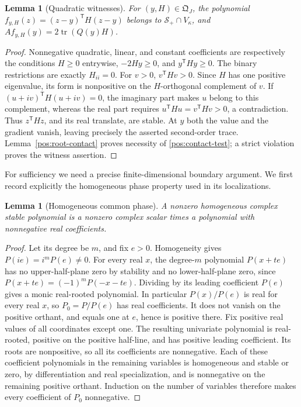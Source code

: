 \documentclass[reqno]{amsart}
\newtheorem{lemma}[theorem]{Lemma}
\theoremstyle{definition}
\theoremstyle{remark}
\begin{document}
\begin{lemma}[Quadratic witnesses]\label{pos:quadratic-witness}
For \((y,H)\in\mathfrak Q_J\), the polynomial
\(f_{y,H}(z)=(z-y)^{\mathsf T}H(z-y)\) belongs to
\(\mathcal S_+\cap V_\kappa\), and
\(Af_{y,H}(y)=2\operatorname{tr}(Q(y)H)\).
\end{lemma}
\begin{proof}
Nonnegative quadratic, linear, and constant coefficients are respectively the
conditions \(H\ge0\) entrywise, \(-2Hy\ge0\), and \(y^{\mathsf T}Hy\ge0\).
The binary restrictions are exactly \(H_{ii}=0\).
For \(v>0\), \(v^{\mathsf T}Hv>0\).  Since \(H\) has one positive eigenvalue,
its form is nonpositive on the \(H\)-orthogonal complement of \(v\).
If \((u+iv)^{\mathsf T}H(u+iv)=0\), the imaginary part makes \(u\) belong
to this complement, whereas the real part requires
\(u^{\mathsf T}Hu=v^{\mathsf T}Hv>0\), a contradiction.
Thus \(z^{\mathsf T}Hz\), and its real translate, are stable.
At \(y\) both the value and the gradient vanish, leaving precisely the asserted
second-order trace.  Lemma~\ref{pos:root-contact} proves necessity of
\eqref{pos:contact-test}; a strict violation proves the witness assertion.
\end{proof}

For sufficiency we need a precise finite-dimensional boundary argument.  We first
record explicitly the homogeneous phase property used in its localizations.

\begin{lemma}[Homogeneous common phase]\label{pos:phase}
A nonzero homogeneous complex stable polynomial is a nonzero complex scalar times
a polynomial with nonnegative real coefficients.
\end{lemma}
\begin{proof}
Let its degree be \(m\), and fix \(e>0\).  Homogeneity gives
\(P(ie)=i^mP(e)\ne0\).  For every real \(x\), the degree-\(m\) polynomial
\(P(x+te)\) has no upper-half-plane zero by stability and no lower-half-plane zero,
since \(P(x+te)=(-1)^mP(-x-te)\).  Dividing by its leading coefficient \(P(e)\)
gives a monic real-rooted polynomial.  In particular \(P(x)/P(e)\) is real for
every real \(x\), so \(P_0=P/P(e)\) has real coefficients.  It does not vanish
on the positive orthant, and equals one at \(e\), hence is positive there.
Fix positive real values of all coordinates except one.  The resulting
univariate polynomial is real-rooted, positive on the positive half-line,
and has positive leading coefficient.  Its roots are nonpositive, so all its
coefficients are nonnegative.  Each of these coefficient polynomials in the
remaining variables is homogeneous and stable or zero, by differentiation and
real specialization, and is nonnegative on the remaining positive orthant.
Induction on the number of variables therefore makes every coefficient of
\(P_0\) nonnegative.
\end{proof}
\end{document}
